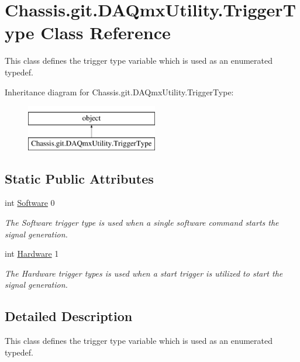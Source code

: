 \hypertarget{class_chassis_8git_1_1_d_a_qmx_utility_1_1_trigger_type}{\section{Chassis.\-git.\-D\-A\-Qmx\-Utility.\-Trigger\-Type Class Reference}
\label{class_chassis_8git_1_1_d_a_qmx_utility_1_1_trigger_type}
}


This class defines the trigger type variable which is used as an enumerated typedef.  


Inheritance diagram for Chassis.\-git.\-D\-A\-Qmx\-Utility.\-Trigger\-Type\-:\begin{figure}[H]
\begin{center}
\leavevmode
\includegraphics[height=2.000000cm]{class_chassis_8git_1_1_d_a_qmx_utility_1_1_trigger_type}
\end{center}
\end{figure}
\subsection*{Static Public Attributes}
\begin{DoxyCompactItemize}
\item 
int \hyperlink{class_chassis_8git_1_1_d_a_qmx_utility_1_1_trigger_type_a1bd6ba4aae43fbd2e43a7ff79f6adb23}{Software} 0
\begin{DoxyCompactList}\small\item\em The Software trigger type is used when a single software command starts the signal generation. \end{DoxyCompactList}\item 
int \hyperlink{class_chassis_8git_1_1_d_a_qmx_utility_1_1_trigger_type_a4c2b5b5bf6e533b796d4e700e34f3c46}{Hardware} 1
\begin{DoxyCompactList}\small\item\em The Hardware trigger types is used when a start trigger is utilized to start the signal generation. \end{DoxyCompactList}\end{DoxyCompactItemize}


\subsection{Detailed Description}
This class defines the trigger type variable which is used as an enumerated typedef. 



